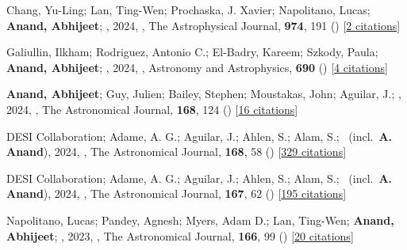 \item[{\color{numcolor}\scriptsize10}] Chang, Yu-Ling; Lan, Ting-Wen; Prochaska, J. Xavier; Napolitano, Lucas; \textbf{Anand, Abhijeet}; \etal, 2024, , The Astrophysical Journal, \textbf{974}, 191 () [\href{https://ui.adsabs.harvard.edu/abs/2024ApJ...974..191C}{2 citations}]

\item[{\color{numcolor}\scriptsize9}] Galiullin, Ilkham; Rodriguez, Antonio C.; El-Badry, Kareem; Szkody, Paula; \textbf{Anand, Abhijeet}; \etal, 2024, , Astronomy and Astrophysics, \textbf{690} () [\href{https://ui.adsabs.harvard.edu/abs/2024A&A...690A.374G}{4 citations}]

\item[{\color{numcolor}\scriptsize8}] \textbf{Anand, Abhijeet}; Guy, Julien; Bailey, Stephen; Moustakas, John; Aguilar, J.; \etal, 2024, , The Astronomical Journal, \textbf{168}, 124 () [\href{https://ui.adsabs.harvard.edu/abs/2024AJ....168..124A}{16 citations}]

\item[{\color{numcolor}\scriptsize7}] DESI Collaboration; Adame, A. G.; Aguilar, J.; Ahlen, S.; Alam, S.; \etal\ (incl.\ \textbf{A. Anand}), 2024, , The Astronomical Journal, \textbf{168}, 58 () [\href{https://ui.adsabs.harvard.edu/abs/2024AJ....168...58D}{329 citations}]

\item[{\color{numcolor}\scriptsize6}] DESI Collaboration; Adame, A. G.; Aguilar, J.; Ahlen, S.; Alam, S.; \etal\ (incl.\ \textbf{A. Anand}), 2024, , The Astronomical Journal, \textbf{167}, 62 () [\href{https://ui.adsabs.harvard.edu/abs/2024AJ....167...62D}{195 citations}]

\item[{\color{numcolor}\scriptsize5}] Napolitano, Lucas; Pandey, Agnesh; Myers, Adam D.; Lan, Ting-Wen; \textbf{Anand, Abhijeet}; \etal, 2023, , The Astronomical Journal, \textbf{166}, 99 () [\href{https://ui.adsabs.harvard.edu/abs/2023AJ....166...99N}{20 citations}]

